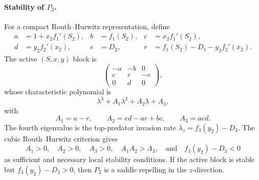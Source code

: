 \paragraph{Stability of \(P_2\).}
For a compact Routh--Hurwitz representation, define
\begin{align*}
a&=1+x_2f_1'(S_2), & b&=f_1(S_2), & c&=x_2f_1'(S_2),\\
d&=y_2f_2'(x_2), & e&=D_2, &
r&=f_1(S_2)-D_1-y_2f_2'(x_2).
\end{align*}
The active \((S,x,y)\) block is
\[
\begin{pmatrix}
-a&-b&0\\
c&r&-e\\
0&d&0
\end{pmatrix},
\]
whose characteristic polynomial is
\begin{equation}
\lambda^3+A_1\lambda^2+A_2\lambda+A_3,
\end{equation}
with
\begin{equation}
\label{eq:p2-cubic-coefficients}
A_1=a-r,\qquad
A_2=ed-ar+bc,\qquad
A_3=aed.
\end{equation}
The fourth eigenvalue is the top-predator invasion rate
\(\lambda_z=f_3(y_2)-D_3\).  The cubic Routh--Hurwitz criterion gives
\begin{equation}
\label{eq:p2-stability}
A_1>0,\quad A_2>0,\quad A_3>0,\quad A_1A_2>A_3,
\quad\text{and}\quad f_3(y_2)-D_3<0
\end{equation}
as sufficient and necessary local stability conditions.  If the active block
is stable but \(f_3(y_2)-D_3>0\), then \(P_2\) is a saddle repelling in the
\(z\)-direction.

